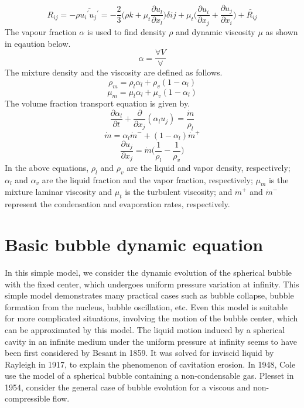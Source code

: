 \begin{equation}
R_{ij} = {- \rho \overline{{{u_i}^\prime}{{u_j}^\prime}}} = - \frac{2}{3}\Bigg({\rho}k +{{\mu}_t}\frac{\partial{u_l}}{\partial{x_l}}\Bigg)\delta{ij} + {{\mu}_t}\Bigg({{\frac{\partial{u_i}}{\partial{x_j}}}
+\frac{\partial{u_j}}{\partial{x_i}}}\Bigg) + {\tilde{R_{ij}}}
\end{equation}
The vapour fraction $\alpha$ is used to find density $\rho$ and dynamic viscosity $\mu$ as shown in eqaution below.
\begin{equation}
\alpha =\frac {\forall{V}}{\forall}
\end{equation}
The mixture density and the viscosity are defined as follows.
\begin{equation}
{{\rho}_m} = {{\rho}_l}{{\alpha}_l} + {{\rho}_v}(1-{{\alpha}_l})
\end{equation}
\begin{equation}
{{\mu}_m} = {{\mu}_l}{{\alpha}_l} +{{\mu}_v}(1-{{\alpha}_l})
\end{equation}
The volume fraction transport equation is given by.
\begin{equation}
\frac{\partial{\alpha}_l}{\partial t}+\frac{\partial}{\partial{x_j}} ({{\alpha}_l}{u_j}) = \frac{\dot{m}}{{\rho}_l}
\end{equation}
\begin{equation}
\dot{m}={{\alpha}_l}\dot{m}^{-} + (1-{{\alpha}_l})\dot{m}^{+}
\end{equation}
\begin{equation}
\frac{\partial{{u_j}}}{\partial{x_j}}=\dot{m}\Bigg(\frac{1}{{\rho}_l}-\frac{1}{{\rho}_v}\Bigg)
\end{equation}
In the above equations, ${\rho}_l$ and ${\rho}_v$ are the liquid and vapor density, respectively; ${\alpha}_l$ and ${\alpha}_v$ are the liquid fraction and the vapor fraction, respectively; ${\mu}_m$ is the mixture laminar viscosity and
${\mu}_t$ is the turbulent viscosity; and $\dot{m}^+$ and $\dot{m}^-$ represent the condensation and evaporation rates, respectively.

\section{Basic bubble dynamic equation}
In this simple model\cite{FundamentalsofCavitation.2004}, we consider the dynamic evolution of the spherical bubble with the fixed center, which undergoes uniform pressure variation at infinity. This simple
model demonstrates many practical cases such as bubble collapse, bubble formation from the nucleus, bubble oscillation, etc. Even this model is suitable for more complicated situations, involving the motion of the bubble
center, which can be approximated by this model. The liquid motion induced by a spherical cavity in an infinite medium under the uniform pressure at infinity seems to have been first considered by Besant in 1859.
It was solved for inviscid liquid by Rayleigh in 1917, to explain the phenomenon of cavitation erosion. In 1948, Cole use the model of a spherical bubble containing a non-condensable gas. Plesset in 1954, 
consider the general case of bubble evolution for a viscous and non-compressible flow.
